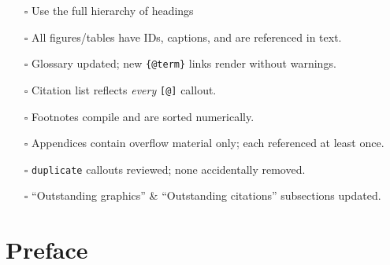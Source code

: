 \documentclass[
  11pt,
  letterpaper,
]{book}
\providecommand{\tightlist}{%
  \setlength{\itemsep}{0pt}\setlength{\parskip}{0pt}}
\begin{document}
\begin{itemize}
\tightlist
\item[$\square$]
  Use the full hierarchy of headings
\item[$\square$]
  All figures/tables have IDs, captions, and are referenced in text.\\
\item[$\square$]
  Glossary updated; new \texttt{\{@term\}} links render without
  warnings.\\
\item[$\square$]
  Citation list reflects \emph{every} \texttt{{[}@{]}} callout.\\
\item[$\square$]
  Footnotes compile and are sorted numerically.\\
\item[$\square$]
  Appendices contain overflow material only; each referenced at least
  once.\\
\item[$\square$]
  \texttt{duplicate} callouts reviewed; none accidentally removed.\\
\item[$\square$]
  ``Outstanding graphics'' \& ``Outstanding citations'' subsections
  updated.
\end{itemize}


\chapter*{Preface}\label{preface-1}

\end{document}
